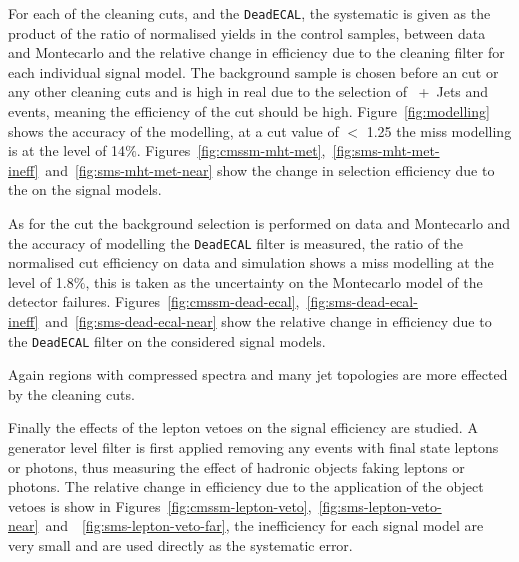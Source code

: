 For each of the cleaning cuts, \Rmiss and the \texttt{DeadECAL}, the 
systematic is given as the product of the ratio of normalised yields in the 
control samples, between data and Montecarlo and the relative change in 
efficiency due to the cleaning filter for each individual signal model. The 
background sample is chosen before an \alt cut or any other cleaning cuts and 
is high in real \MET due to the selection of \HepProcess{\PW}~+~Jets and 
\HepProcess{\Ptop\APtop} events, meaning the efficiency of the \Rmiss cut 
should be high. Figure~\ref{fig:modelling} shows the accuracy of the \Rmiss 
modelling, at a cut value of \Rmiss $<$ 1.25 the miss modelling is at the level 
of 14$\%$. Figures~\ref{fig:cmssm-mht-met},~\ref{fig:sms-mht-met-ineff}~and~\ref{fig:sms-mht-met-near} show the change in selection efficiency due to the \Rmiss on the 
signal models.

As for the \Rmiss cut the background selection is performed on data and 
Montecarlo and the accuracy of modelling the \texttt{DeadECAL} filter is 
measured, the ratio of the normalised cut efficiency on data and simulation 
shows a miss modelling at the level of 1.8$\%$, this is taken as the 
uncertainty on the Montecarlo model of the detector failures. 
Figures~\ref{fig:cmssm-dead-ecal},~\ref{fig:sms-dead-ecal-ineff}~and~\ref{fig:sms-dead-ecal-near} show the relative change in efficiency due to the 
\texttt{DeadECAL} filter on the considered signal models.

Again regions with compressed spectra and many jet topologies are more effected 
by the cleaning cuts.

Finally the effects of the lepton vetoes on the signal efficiency are studied. 
A generator level filter is first applied removing any events with final state 
leptons or photons, thus measuring the effect of hadronic objects faking 
leptons or photons. The relative change in efficiency due to the application of 
the object vetoes is show in 
Figures~\ref{fig:cmssm-lepton-veto},~\ref{fig:sms-lepton-veto-near}~and~~\ref{fig:sms-lepton-veto-far}, the inefficiency for each signal model are very small 
and are used directly as the systematic error.


